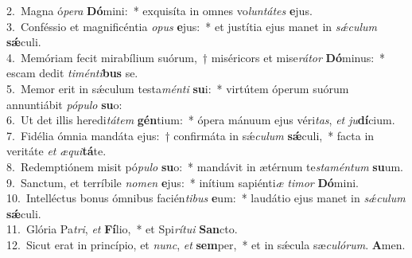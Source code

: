 {2.~}Magna ó\textit{pe}\textit{ra} \textbf{Dó}mini:~* exquisíta in omnes vo\textit{lun}\textit{tá}\textit{tes} \textbf{e}jus.\\
{3.~}Conféssio et magnificéntia \textit{o}\textit{pus} \textbf{e}jus:~* et justítia ejus manet in \textit{sǽ}\textit{cu}\textit{lum} \textbf{sǽ}culi.\\
{4.~}Memóriam fecit mirabílium suórum,~† miséricors et mise\textit{rá}\textit{tor} \textbf{Dó}minus:~* escam dedit \textit{ti}\textit{mén}\textit{ti}\textbf{bus} se.\\
{5.~}Memor erit in sǽculum testa\textit{mén}\textit{ti} \textbf{su}i:~* virtútem óperum suórum annuntiábit \textit{pó}\textit{pu}\textit{lo} \textbf{su}o:\\
{6.~}Ut det illis heredi\textit{tá}\textit{tem} \textbf{gén}tium:~* ópera mánuum ejus véri\textit{tas}, \textit{et} \textit{ju}\textbf{dí}cium.\\
{7.~}Fidélia ómnia mandáta ejus:~† confirmáta in sǽ\textit{cu}\textit{lum} \textbf{sǽ}culi,~* facta in veritáte \textit{et} \textit{æ}\textit{qui}\textbf{tá}te.\\
{8.~}Redemptiónem misit pó\textit{pu}\textit{lo} \textbf{su}o:~* mandávit in ætérnum te\textit{sta}\textit{mén}\textit{tum} \textbf{su}um.\\
{9.~}Sanctum, et terríbile \textit{no}\textit{men} \textbf{e}jus:~* inítium sapiénti\textit{æ} \textit{ti}\textit{mor} \textbf{Dó}mini.\\
{10.~}Intelléctus bonus ómnibus facién\textit{ti}\textit{bus} \textbf{e}um:~* laudátio ejus manet in \textit{sǽ}\textit{cu}\textit{lum} \textbf{sǽ}culi.\\
{11.~}Glória Pa\textit{tri}, \textit{et} \textbf{Fí}lio,~* et Spi\textit{rí}\textit{tu}\textit{i} \textbf{San}cto.\\
{12.~}Sicut erat in princípio, et \textit{nunc}, \textit{et} \textbf{sem}per,~* et in sǽcula sæ\textit{cu}\textit{ló}\textit{rum}. \textbf{A}men.\\
